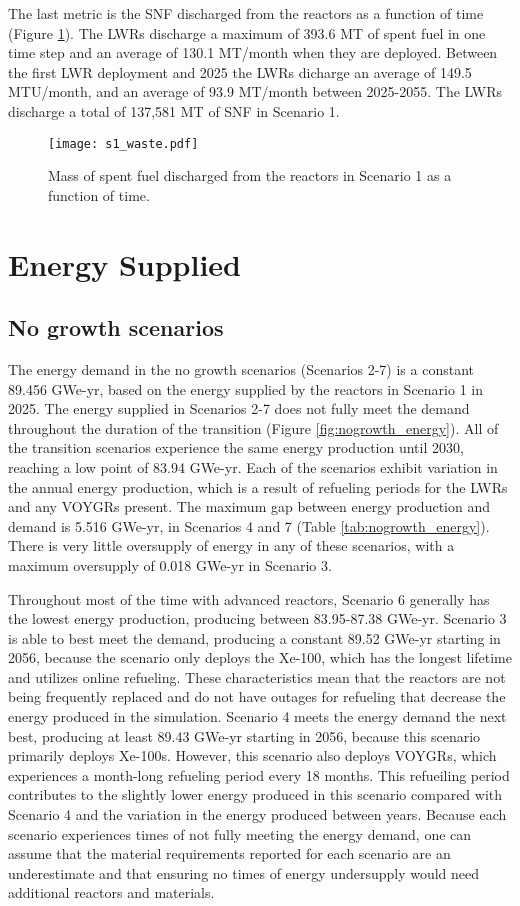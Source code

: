 The last metric is the \gls{SNF} discharged from the reactors as a function of
time (Figure \ref{fig:waste1}). The \glspl{LWR} discharge a maximum of 393.6 MT 
of spent fuel in one time step and an average of 130.1 MT/month when they are 
deployed. Between the first \gls{LWR} deployment and 2025 the \glspl{LWR} 
dicharge an average of 149.5 MTU/month, and an average of 93.9 MT/month  
between 2025-2055. The \glspl{LWR} discharge a total of 137,581 MT of \gls{SNF} 
in Scenario 1. 

\begin{figure}
    \centering
    \texttt{[image: s1\_waste.pdf]}
    \caption{Mass of spent fuel discharged from the reactors in Scenario 1 as a function of time.}
    \label{fig:waste1}
\end{figure}

\section{Energy Supplied}
\subsection{No growth scenarios}
The energy demand in the no growth scenarios (Scenarios 2-7) is a constant
89.456 GWe-yr, based on the energy supplied by the reactors in Scenario 1
in 2025. The energy supplied in Scenarios 2-7 does not fully meet the demand
throughout the duration of the transition (Figure \ref{fig:nogrowth_energy}). 
All of the 
transition scenarios experience the same energy production until 2030,
reaching a low point of 83.94 GWe-yr. Each of the scenarios exhibit variation 
in the annual energy production, which is a result of refueling 
periods for the \glspl{LWR} and any VOYGRs present. The maximum gap between 
energy production and demand is 5.516 GWe-yr, in Scenarios 4 and 7 
(Table \ref{tab:nogrowth_energy}). There 
is very little oversupply of energy in any of these scenarios, with a 
maximum oversupply of 0.018 GWe-yr in Scenario 3.

Throughout 
most of the time with advanced reactors, Scenario 6 generally has the 
lowest energy 
production, producing between 83.95-87.38 GWe-yr. Scenario 3 is able 
to best meet the demand, producing a constant 89.52 GWe-yr starting in 2056,
because the scenario only deploys the Xe-100, which has the longest lifetime 
and utilizes online refueling. These characteristics mean that the reactors 
are not being frequently replaced and do not have outages for refueling 
that decrease the energy produced in the simulation. Scenario 4 meets the 
energy demand the next best, producing at least 89.43 GWe-yr starting in 
2056, because this scenario primarily deploys Xe-100s. However, this scenario 
also deploys VOYGRs, which experiences a month-long refueling period 
every 18 months. This refueiling period contributes to the slightly lower 
energy produced in this scenario compared with Scenario 4 and the 
variation in the energy produced between years.
Because each scenario experiences times of not fully meeting the energy 
demand, one can assume that the material requirements reported for each 
scenario are an underestimate and that ensuring no times of 
energy undersupply would need additional reactors and materials.

